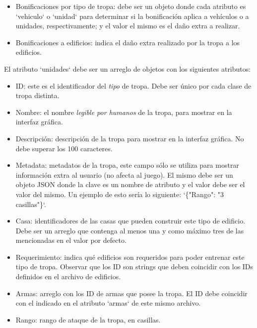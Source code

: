 \documentclass[titlepage,a4paper,12pt]{article}
\begin{document}
\begin{itemize}
\begin{itemize}
\item Bonificaciones por tipo de tropa: debe ser un objeto donde cada atributo es `vehiculo` o `unidad` para determinar si la bonificación aplica a vehículos o a unidades, respectivamente; y el valor el mismo es el daño extra a realizar.

\item Bonificaciones a edificios: indica el daño extra realizado por la tropa a los edificios.

\end{itemize}

El atributo `unidades` debe ser un arreglo de objetos con los siguientes atributos:  

\begin{itemize}

\item ID: este es el identificador del \textit{tipo} de tropa. Debe ser único por cada clase de tropa distinta.

\item Nombre: el nombre \textit{legible por humanos} de la tropa, para mostrar en la interfaz gráfica.

\item Descripción: descripción de la tropa para mostrar en la interfaz gráfica. No debe superar los 100 caracteres.

\item Metadata: metadatos de la tropa, este campo sólo se utiliza para mostrar información extra al usuario (no afecta al juego). El mismo debe ser un objeto JSON donde la clave es un nombre de atributo y el valor debe ser el valor del mismo. Un ejemplo de esto sería lo siguiente: `\{"Rango": "3 casillas"\}`.

\item Casa: identificadores de las casas que pueden construir este tipo de edificio. Debe ser un arreglo que contenga al menos una y como máximo tres de las mencionadas en el valor por defecto. 

\item Requerimiento: indica qué edificios son requeridos para poder entrenar este tipo de tropa. Observar que los ID son strings que deben coincidir con los IDs definidos en el archivo de edificios.

\item Armas: arreglo con los ID de armas que posee la tropa. El ID debe coincidir con el indicado en el atributo `armas` de este mismo archivo.

\item Rango: rango de ataque de la tropa, en casillas.


\end{itemize}
\end{itemize}
\end{document}
